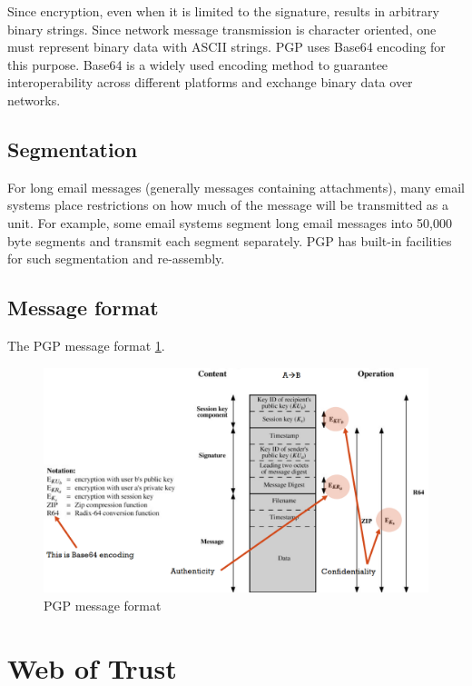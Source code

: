 Since encryption, even when it is limited to the signature, results in arbitrary binary strings. Since network message transmission is character oriented, one must represent binary data with ASCII strings. PGP uses Base64 encoding for this purpose. Base64 is a widely used encoding method to guarantee interoperability across different platforms and exchange binary data over networks.

\subsection{Segmentation}

For long email messages (generally messages containing attachments), many
email systems place restrictions on how much of the message will be transmitted as a unit. For example, some email systems segment long email messages into 50,000 byte segments and transmit each segment separately. PGP has built-in facilities for such segmentation and re-assembly.

\subsection{Message format}

The PGP message format \ref{fig:pgp-message-format}.

\begin{figure}
	\centering
	\includegraphics[width=0.7\linewidth]{Images/Chapter7/pgp-message-format}
	\caption{PGP message format}
	\label{fig:pgp-message-format}
\end{figure}



\section{Web of Trust}

